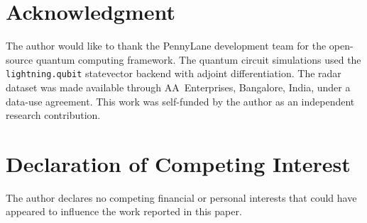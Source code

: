 \documentclass[journal]{IEEEtran}
\begin{document}
\section*{Acknowledgment}
The author would like to thank the PennyLane development team for the open-source quantum computing framework. The quantum circuit simulations used the \texttt{lightning.qubit} statevector backend with adjoint differentiation. The radar dataset was made available through AA~Enterprises, Bangalore, India, under a data-use agreement. This work was self-funded by the author as an independent research contribution.

\section*{Declaration of Competing Interest}
The author declares no competing financial or personal interests that could have appeared to influence the work reported in this paper.
\end{document}
